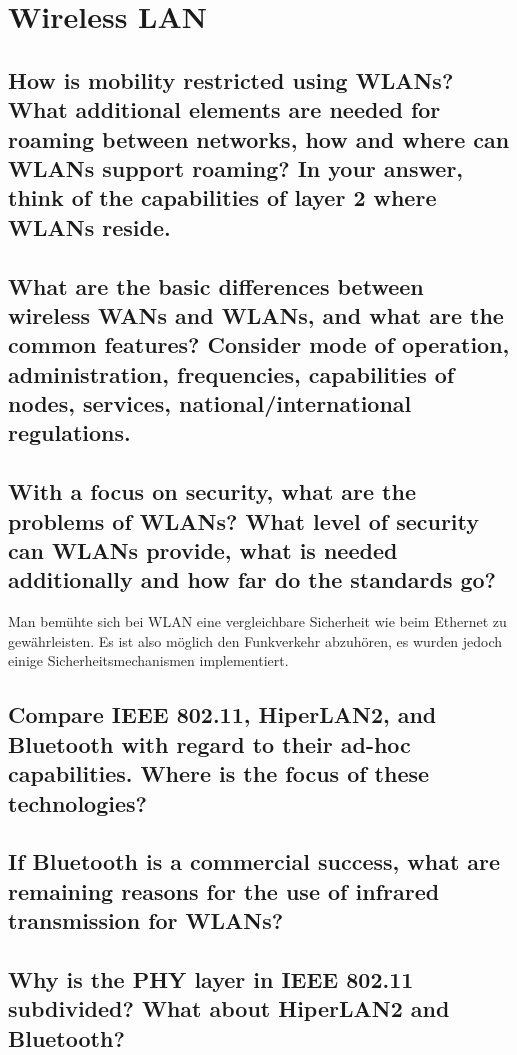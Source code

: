 \section{Wireless LAN}

\subsection{How is mobility restricted using WLANs? What additional elements are needed for roaming between networks, how and where can WLANs support roaming? In your answer, think of the capabilities of layer 2 where WLANs reside.}

\subsection{What are the basic differences between wireless WANs and WLANs, and what are the common features? Consider mode of operation, administration, frequencies, capabilities of nodes, services, national/international regulations.}

\subsection{With a focus on security, what are the problems of WLANs? What level of security can WLANs provide, what is needed additionally and how far do the standards go?}
Man bemühte sich bei WLAN eine vergleichbare Sicherheit wie beim Ethernet zu gewährleisten. Es ist also möglich den Funkverkehr abzuhören, es wurden jedoch einige Sicherheitsmechanismen implementiert.

\subsection{Compare IEEE 802.11, HiperLAN2, and Bluetooth with regard to their ad-hoc capabilities. Where is the focus of these technologies?}

\subsection{If Bluetooth is a commercial success, what are remaining reasons for the use of infrared transmission for WLANs?}

\subsection{Why is the PHY layer in IEEE 802.11 subdivided? What about HiperLAN2 and Bluetooth?}

